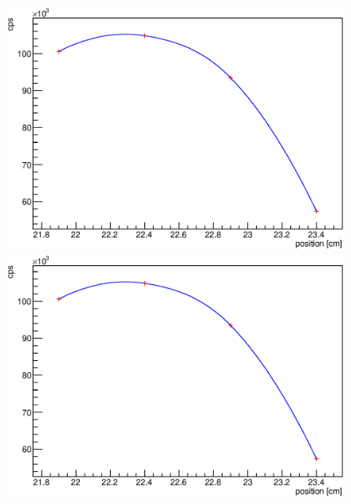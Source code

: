 \begin{figure}
\begin{minipage}[d]{0.24 \textwidth}
	\end{minipage}
	\begin{minipage}[d]{0.24 \textwidth}
		  \includegraphics[width=\textwidth]{graphics/cobalt/modules/2A.eps}
	\end{minipage}
	\begin{minipage}[d]{0.24 \textwidth}
		  \includegraphics[width=\textwidth]{graphics/cobalt/modules/2A.eps}
	\end{minipage}\newline
	

\end{figure}
